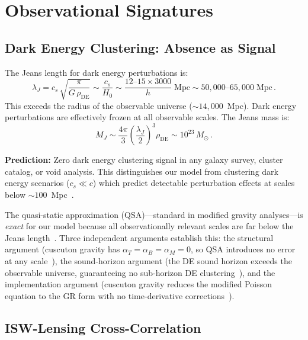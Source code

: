 \section{Observational Signatures}
\label{sec:5-signatures}

\subsection{Dark Energy Clustering: Absence as Signal}
\label{sec:5-clustering}

The Jeans length for dark energy perturbations is:
\begin{equation}
  \lambda_J = c_s\,\sqrt{\frac{\pi}{G\,\rho_\mathrm{DE}}}
            \sim \frac{c_s}{H_0}
            \sim \frac{12\text{--}15 \times 3000}{h}\;\mathrm{Mpc}
            \sim 50{,}000\text{--}65{,}000\;\mathrm{Mpc}\,.
  \label{eq:5-18}
\end{equation}
This exceeds the radius of the observable universe (${\sim}14{,}000$~Mpc). Dark energy perturbations are effectively frozen at all observable scales. The Jeans mass is:
\begin{equation}
  M_J \sim \frac{4\pi}{3}\left(\frac{\lambda_J}{2}\right)^3 \rho_\mathrm{DE}
       \sim 10^{23}\,M_\odot\,.
  \label{eq:5-19}
\end{equation}

\textbf{Prediction:} Zero dark energy clustering signal in any galaxy survey, cluster catalog, or void analysis. This distinguishes our model from clustering dark energy scenarios ($c_s \ll c$) which predict detectable perturbation effects at scales below ${\sim}100$~Mpc~\cite{ch5:Takada2006}.

The quasi-static approximation (QSA)---standard in modified gravity analyses---is \emph{exact} for our model because all observationally relevant scales are far below the Jeans length~\cite{ch5:Baker2013}. Three independent arguments establish this: the structural argument (cuscuton gravity has $\alpha_T = \alpha_B = \alpha_M = 0$, so QSA introduces no error at any scale~\cite{ch5:SawickiBellini2015}), the sound-horizon argument (the DE sound horizon exceeds the observable universe, guaranteeing no sub-horizon DE clustering~\cite{ch5:BoruahHudsonLuben2017}), and the implementation argument (cuscuton gravity reduces the modified Poisson equation to the GR form with no time-derivative corrections~\cite{ch5:HiramatsuKobayashi2022}).

\subsection{ISW-Lensing Cross-Correlation}
\label{sec:5-isw}

